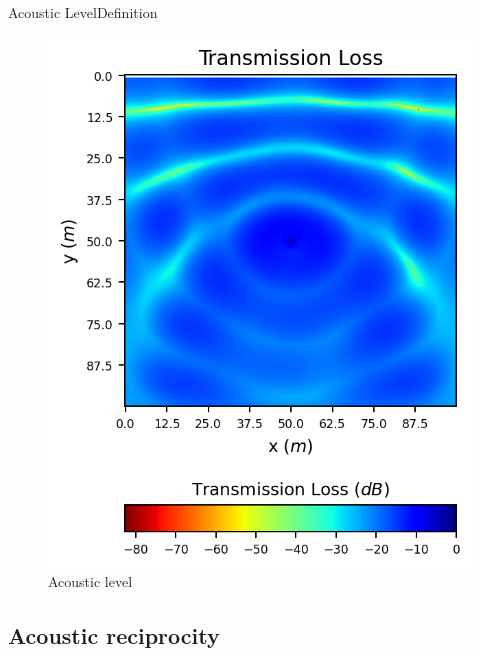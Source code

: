 \documentclass[9pt, xcolor={usenames, dvipsnames}]{beamer}
\begin{document}
\begin{frame}{Acoustic Level}{Definition}
\begin{minipage}[c]{0.35\textwidth}
\begin{figure}
							\includegraphics[width=\textwidth]{images/sphere/ampltude.png}
							\caption{Acoustic level}
						\end{figure}
					\end{minipage}
				\end{frame}

			\subsection{Acoustic reciprocity}
\end{document}
